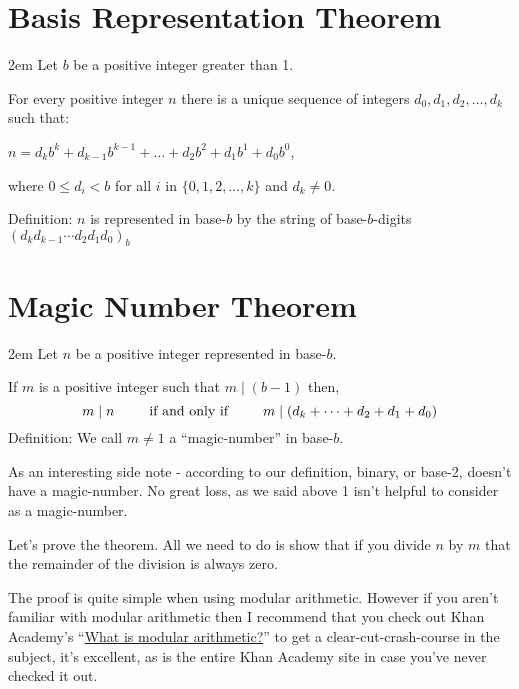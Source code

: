 \documentclass{article}
\newenvironment{jprIn}{\begin{adjustwidth}{2em}{}}{\end{adjustwidth}}
\begin{document}
\section*{Basis Representation Theorem}
\begin{jprIn}
Let $b$ be a positive integer greater than 1.

For every positive integer $n$ there is a unique sequence
of integers $d_0, d_1, d_2,\dots{},d_k$ such that:

\hspace{3em}$n=d_kb^k+d_{k-1}b^{k-1}+\dots+d_2b^2+d_1b^1+d_0b^0$,

where $0\le{}d_i<b$ for all $i$ in $\{0,1,2,\dots{},k\}$ and $d_k\ne0$.

Definition: $n$ is represented in base-$b$ by the string
of base-$b$-digits $(d_kd_{k-1}{\cdots}d_2d_1d_0)_b$
\end{jprIn}
%
\section*{Magic Number Theorem}
\begin{jprIn}
Let $n$ be a positive integer represented in base-$b$.

If $m$ is a positive integer such that $m\mid{}(b-1)$ then,
\[m\mid{}n \text{\hspace{2.5em}if and only if\hspace{2.5em}}m\mid{}(d_k+\dots+d_2+d_1+d_0)\]
Definition: We call $m\ne1$ a ``magic-number'' in base-$b$.
\end{jprIn}
\bigskip

As an interesting side note - according to our definition, binary,
or base-2, doesn't have a magic-number.
No great loss, as we said above 1 isn't helpful to consider as a magic-number. 

Let's prove the theorem. All we need to do is show that if you divide $n$ by $m$
that the remainder of the division is always zero.

The proof is quite simple when using 
modular arithmetic. However if you aren't familiar with modular arithmetic
then I recommend that you check out Khan Academy's
``\href{https://www.khanacademy.org/computing/computer-science/cryptography/modarithmetic/a/what-is-modular-arithmetic}{What is modular arithmetic?}'' to
get a clear-cut-crash-course in the subject, it's excellent, as is the 
entire Khan Academy site in case you've never checked it out.
\end{document}
